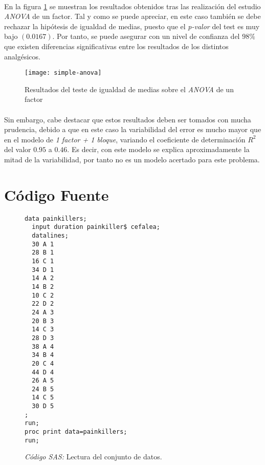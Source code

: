 \documentclass[11pt]{article}
\begin{document}
      \paragraph{}
      En la figura \ref{fig:simple-anova-results} se muestran los resultados obtenidos tras las realización del estudio \emph{ANOVA} de un factor. Tal y como se puede apreciar, en este caso también se debe rechazar la hipótesis de igualdad de medias, puesto que el \emph{p-valor} del test es muy bajo $(0.0167)$. Por tanto, se puede asegurar con un nivel de confianza del $98\%$ que existen diferencias significativas entre los resultados de los distintos analgésicos.

      \begin{figure}[!h]
        \centering
        \texttt{[image: simple-anova]}
        \caption{Resultados del teste de igualdad de medias sobre el \emph{ANOVA} de un factor}
        \label{fig:simple-anova-results}
      \end{figure}


      \paragraph{}
      Sin embargo, cabe destacar que estos resultados deben ser tomados con mucha prudencia, debido a que en este caso la variabilidad  del error es mucho mayor que en el modelo de \emph{1 factor + 1 bloque}, variando el coeficiente de determinación $R^2$ del valor $0.95$ a $0.46$. Es decir, con este modelo se explica aproximadamente la mitad de la variabilidad, por tanto no es un modelo acertado para este problema.

  \section{Código Fuente}
  
    \begin{figure}[!h]
      \centering
      \begin{verbatim}
data painkillers;
  input duration painkiller$ cefalea;
  datalines;
  30 A 1
  28 B 1
  16 C 1
  34 D 1
  14 A 2
  14 B 2
  10 C 2
  22 D 2
  24 A 3
  20 B 3
  14 C 3
  28 D 3
  38 A 4
  34 B 4
  20 C 4
  44 D 4
  26 A 5
  24 B 5
  14 C 5
  30 D 5
;
run;
proc print data=painkillers;
run;
      \end{verbatim}
      \caption{\emph{Código SAS:} Lectura del conjunto de datos.}
      \label{code:sas_1}
    \end{figure}
\end{document}
